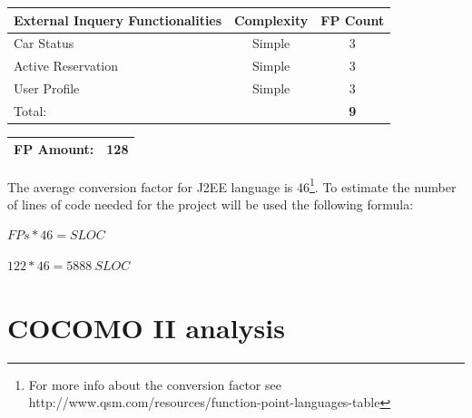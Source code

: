 \documentclass{article}
\begin{document}
			\renewcommand{\arraystretch}{1.2}
			\setlength{\tabcolsep}{12pt}
			\begin{center}
				\begin{tabular}{| p{7cm} | p{2.5cm} | p{1.8cm} |}\hline
					\textbf{External Inquery Functionalities} & \multicolumn{1}{|c|}{\textbf{Complexity}} & \textbf{FP Count}\\\hline						
					Car Status & \multicolumn{1}{|c|}{Simple} & \multicolumn{1}{|c|}{3}\\\hline
					Active Reservation & \multicolumn{1}{|c|}{Simple} & \multicolumn{1}{|c|}{3}\\\hline
					User Profile & \multicolumn{1}{|c|}{Simple} & \multicolumn{1}{|c|}{3}\\\hline	
					\multicolumn{2}{|l|}{Total:} & \multicolumn{1}{|c|}{\textbf{9}}\\\hline	
				\end{tabular}
			\end{center}
		
			\renewcommand{\arraystretch}{1.2}
			\setlength{\tabcolsep}{12pt}
			\begin{center}
				\begin{tabular}{| p{9.9cm} | p{1.8cm} |}\hline
					FP Amount: & 128\\\hline	
				\end{tabular}
			\end{center}
		The average conversion factor for J2EE language is 46\footnote[1]{For more info about the conversion factor see http://www.qsm.com/resources/function-point-languages-table}. To estimate the number of lines of code needed for the project will be used the following formula:
		\begin{center}\(FPs * 46 = SLOC\)\end{center}
		\begin{center}\(122 * 46 = 5888\ SLOC\)\end{center}
		\pagebreak
	\section{COCOMO II analysis}
\end{document}

